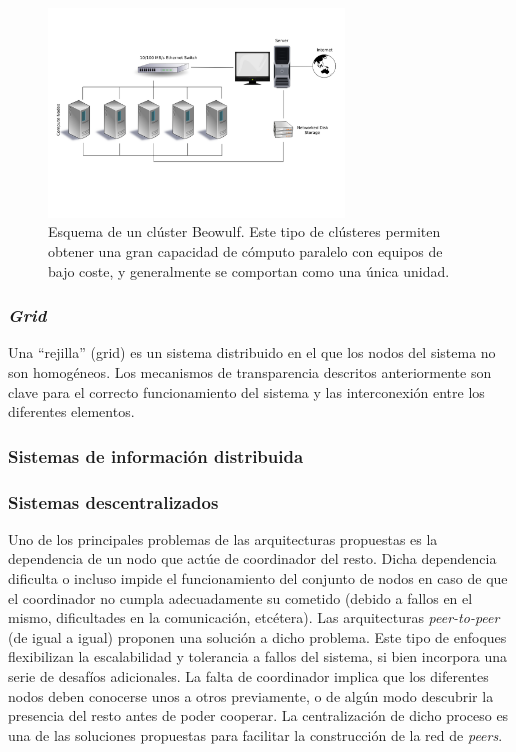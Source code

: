 \begin{figure}[H]
  \centering
  \includegraphics[width=0.7\textwidth]{Chapter2/Figures/Beowulf.png}
  \caption[Beowulf]{Esquema de un clúster Beowulf. Este tipo de clústeres permiten obtener una gran capacidad de cómputo paralelo con equipos de bajo coste, y generalmente se comportan como una única unidad.}
\label{fig:beowulf}
\end{figure}

\subsubsection{\textit{Grid}}

Una ``rejilla'' (grid) es un sistema distribuido en el que los nodos del sistema no son homogéneos. Los mecanismos de transparencia descritos anteriormente son clave para el correcto funcionamiento del sistema y las interconexión entre los diferentes elementos.

\subsubsection{Sistemas de información distribuida}
\citationneeded

\subsubsection{Sistemas descentralizados}

Uno de los principales problemas de las arquitecturas propuestas es la dependencia de un nodo que actúe de coordinador del resto. Dicha dependencia dificulta o incluso impide el funcionamiento del conjunto de nodos en caso de que el coordinador no cumpla adecuadamente su cometido (debido a fallos en el mismo, dificultades en la comunicación, etcétera). Las arquitecturas \textit{peer-to-peer} (de igual a igual) proponen una solución a dicho problema. Este tipo de enfoques flexibilizan la escalabilidad y tolerancia a fallos del sistema, si bien incorpora una serie de desafíos adicionales. La falta de coordinador implica que los diferentes nodos deben conocerse unos a otros previamente, o de algún modo descubrir la presencia del resto antes de poder cooperar. La centralización de dicho proceso es una de las soluciones propuestas para facilitar la construcción de la red de \textit{peers}\citationneeded.


